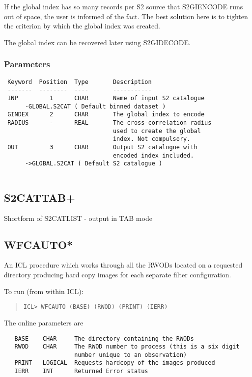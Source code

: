 \documentclass{book}
\renewcommand{\_}{{\tt\char'137}}     %
\begin{document}
If the global index has so many records per S2 source that
S2GIENCODE runs out of space, the user is informed of the
fact. The best solution here is to tighten the criterion
by which the global index was created.
 
The global index can be recovered later using S2GIDECODE.
 
\subsubsection{Parameters}
\begin{verbatim}
 Keyword  Position  Type       Description
 -------  --------  ----       -----------
 INP         1      CHAR       Name of input S2 catalogue
      -GLOBAL.S2CAT ( Default binned dataset )
 GINDEX      2      CHAR       The global index to encode
 RADIUS      -      REAL       The cross-correlation radius
                               used to create the global
                               index. Not compulsory.
 OUT         3      CHAR       Output S2 catalogue with
                               encoded index included.
      ->GLOBAL.S2CAT ( Default S2 catalogue )
 
\end{verbatim}\subsection{S2CATTAB+}
Shortform of S2CATLIST - output in TAB mode
 
\subsection{WFCAUTO*}
An ICL procedure which works through all the RWODs located on a
requested directory producing hard copy images for each separate filter
configuration.
 
To run (from within ICL):
\begin{quote}\begin{verbatim}
ICL> WFCAUTO (BASE) (RWOD) (PRINT) (IERR)
\end{verbatim}\end{quote}
The online parameters are
\begin{verbatim}
   BASE    CHAR     The directory containing the RWODs
   RWOD    CHAR     The RWOD number to process (this is a six digit
                    number unique to an observation)
   PRINT   LOGICAL  Requests hardcopy of the images produced
   IERR    INT      Returned Error status
\end{verbatim}
\end{document}
